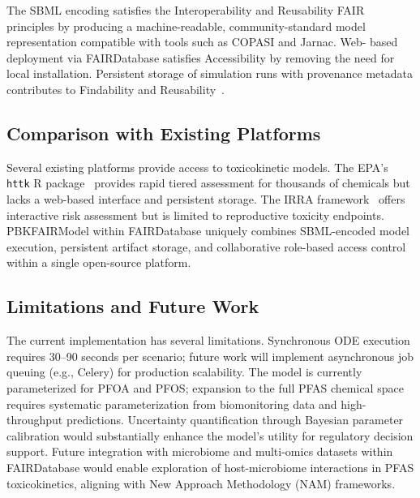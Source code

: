 \documentclass[preprint,12pt]{elsarticle}
\begin{document}
\begin{linenumbers}
The SBML encoding satisfies the Interoperability and Reusability FAIR
principles by producing a machine-readable, community-standard model
representation compatible with tools such as COPASI and Jarnac. Web-
based deployment via FAIRDatabase satisfies Accessibility by removing
the need for local installation. Persistent storage of simulation
runs with provenance metadata contributes to Findability and
Reusability~\cite{wilkinson2016}.

\subsection{Comparison with Existing Platforms}


Several existing platforms provide access to toxicokinetic models.
The EPA's \texttt{httk} R package~\cite{pearce2017} provides rapid
tiered assessment for thousands of chemicals but lacks a web-based
interface and persistent storage. The IRRA framework~\cite{mACQUIRE}
offers interactive risk assessment but is limited to reproductive
toxicity endpoints. PBKFAIRModel within FAIRDatabase uniquely combines
SBML-encoded model execution, persistent artifact storage, and
collaborative role-based access control within a single open-source
platform.

\subsection{Limitations and Future Work}


The current implementation has several limitations. Synchronous ODE
execution requires 30--90 seconds per scenario; future work will
implement asynchronous job queuing (e.g., Celery) for production
scalability. The model is currently parameterized for PFOA and PFOS;
expansion to the full PFAS chemical space requires systematic
parameterization from biomonitoring data and high-throughput
predictions. Uncertainty quantification through Bayesian parameter
calibration would substantially enhance the model's utility for
regulatory decision support. Future integration with microbiome and
multi-omics datasets within FAIRDatabase would enable exploration of
host-microbiome interactions in PFAS toxicokinetics, aligning with
New Approach Methodology (NAM) frameworks.


\end{linenumbers}
\end{document}
